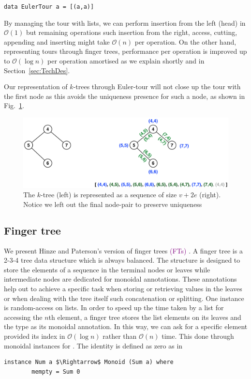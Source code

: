 \documentclass{elsarticle}
\newcommand{\code}[1]{\haskell{#1}}
\newcommand{\madd}[1]{\textcolor{Purple}{#1}}
\renewcommand{\O}{\ensuremath{\mathcal{O}}}
\begin{document}
\begin{lstlisting}
data EulerTour a = [(a,a)] 
\end{lstlisting}

By managing the tour with lists, we can perform insertion from the left (head) in $\O(1)$ but remaining operations such insertion from the right, access, cutting, appending and inserting might take $\O(n)$ per operation.
On the other hand, representing tours through finger trees, performance per operation is improved up to $\O(\log n)$ per operation amortised as we explain shortly and in Section~\ref{sec:TechDes}. 

Our representation of $k$-trees through Euler-tour will not close up the tour with the first node as this avoids the uniqueness presence for such a node, as shown in Fig.~\ref{fig:Euler-tour}.

\begin{figure}[H]
\begin{center}
\includegraphics[scale=0.35]{./Images/Euler-tour} 
\end{center}
\caption{The $k$-tree (left) is represented as a sequence of size $v+2e$ (right). Notice we left out the final node-pair to preserve uniqueness}
\label{fig:Euler-tour}
\end{figure}


\subsection{Finger tree} 

We present Hinze and Paterson's version of finger trees \madd{(FTs)} \cite{FTs}. A finger tree is a 2-3-4 tree data structure which is always balanced. The structure is designed to store the elements of a sequence in the terminal nodes or leaves while intermediate nodes are dedicated for monoidal annotations. These annotations help out to achieve a specific task when storing or retrieving values in the leaves or when dealing with the tree itself such concatenation or splitting. One instance is random-access on lists. In order to speed up the time taken by a list for accessing the $n$th element, a finger tree stores the list elements on its leaves and the type \code{Sum Int} as its monoidal annotation. In this way, we can ask for a specific element provided its index in $\O(\log n)$ rather than $\O(n)$ time. This done through monoidal instances for \code{Sum}. The identity is defined as zero as in 
\begin{lstlisting}[mathescape]
instance Num a $\Rightarrow$ Monoid (Sum a) where
        mempty = Sum 0
\end{lstlisting}
\end{document}

